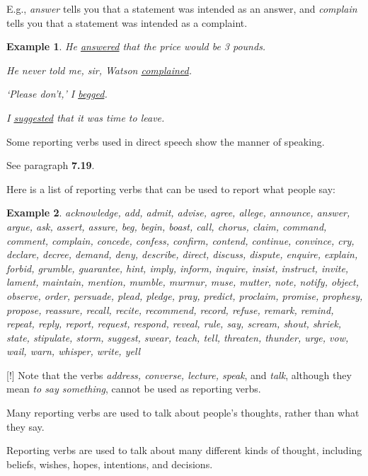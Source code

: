 \documentclass[oneside]{book}
\numberwithin{equation}{section}
\newtheorem{example}{Example}[section]
\begin{document}
E.g., \textit{answer} tells you that a statement was intended as an answer, and \textit{complain} tells you that a statement was intended as a complaint.
\begin{example}
    He \underline{answered} that the price would be 3 pounds.
    
    He never told me, sir, Watson \underline{complained}.
    
    `Please don't,' I \underline{begged}.
    
    I \underline{suggested} that it was time to leave.
\end{example}
Some reporting verbs used in direct speech show the manner of speaking.

See paragraph \textbf{7.19}.

%
Here is a list of reporting verbs that can be used to report what people say:
\begin{example}
    acknowledge, add, admit, advise, agree, allege, announce, answer, argue, ask, assert, assure, beg, begin, boast, call, chorus, claim, command, comment, complain, concede, confess, confirm, contend, continue, convince, cry, declare, decree, demand, deny, describe, direct, discuss, dispute, enquire, explain, forbid, grumble, guarantee, hint, imply, inform, inquire, insist, instruct, invite, lament, maintain, mention, mumble, murmur, muse, mutter, note, notify, object, observe, order, persuade, plead, pledge, pray, predict, proclaim, promise, prophesy, propose, reassure, recall, recite, recommend, record, refuse, remark, remind, repeat, reply, report, request, respond, reveal, rule, say, scream, shout, shriek, state, stipulate, storm, suggest, swear, teach, tell, threaten, thunder, urge, vow, wail, warn, whisper, write, yell
\end{example}
%
\noindent{} [!] Note that the verbs \textit{address, converse, lecture, speak}, and \textit{talk}, although they mean \textit{to say something}, cannot be used as reporting verbs.

%
\noindent{} Many reporting verbs are used to talk about people's thoughts, rather than what they say.

Reporting verbs are used to talk about many different kinds of thought, including beliefs, wishes, hopes, intentions, and decisions.
\end{document}

